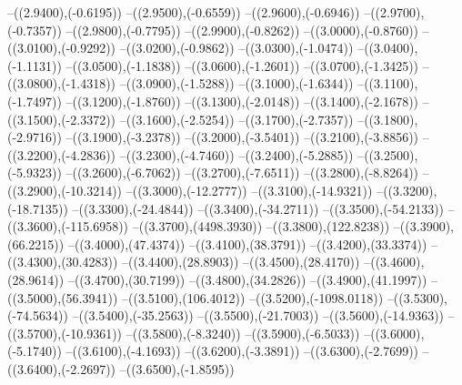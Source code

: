 {	--({\sx*(2.9400)},{\sy*(-0.6195)})
	--({\sx*(2.9500)},{\sy*(-0.6559)})
	--({\sx*(2.9600)},{\sy*(-0.6946)})
	--({\sx*(2.9700)},{\sy*(-0.7357)})
	--({\sx*(2.9800)},{\sy*(-0.7795)})
	--({\sx*(2.9900)},{\sy*(-0.8262)})
	--({\sx*(3.0000)},{\sy*(-0.8760)})
	--({\sx*(3.0100)},{\sy*(-0.9292)})
	--({\sx*(3.0200)},{\sy*(-0.9862)})
	--({\sx*(3.0300)},{\sy*(-1.0474)})
	--({\sx*(3.0400)},{\sy*(-1.1131)})
	--({\sx*(3.0500)},{\sy*(-1.1838)})
	--({\sx*(3.0600)},{\sy*(-1.2601)})
	--({\sx*(3.0700)},{\sy*(-1.3425)})
	--({\sx*(3.0800)},{\sy*(-1.4318)})
	--({\sx*(3.0900)},{\sy*(-1.5288)})
	--({\sx*(3.1000)},{\sy*(-1.6344)})
	--({\sx*(3.1100)},{\sy*(-1.7497)})
	--({\sx*(3.1200)},{\sy*(-1.8760)})
	--({\sx*(3.1300)},{\sy*(-2.0148)})
	--({\sx*(3.1400)},{\sy*(-2.1678)})
	--({\sx*(3.1500)},{\sy*(-2.3372)})
	--({\sx*(3.1600)},{\sy*(-2.5254)})
	--({\sx*(3.1700)},{\sy*(-2.7357)})
	--({\sx*(3.1800)},{\sy*(-2.9716)})
	--({\sx*(3.1900)},{\sy*(-3.2378)})
	--({\sx*(3.2000)},{\sy*(-3.5401)})
	--({\sx*(3.2100)},{\sy*(-3.8856)})
	--({\sx*(3.2200)},{\sy*(-4.2836)})
	--({\sx*(3.2300)},{\sy*(-4.7460)})
	--({\sx*(3.2400)},{\sy*(-5.2885)})
	--({\sx*(3.2500)},{\sy*(-5.9323)})
	--({\sx*(3.2600)},{\sy*(-6.7062)})
	--({\sx*(3.2700)},{\sy*(-7.6511)})
	--({\sx*(3.2800)},{\sy*(-8.8264)})
	--({\sx*(3.2900)},{\sy*(-10.3214)})
	--({\sx*(3.3000)},{\sy*(-12.2777)})
	--({\sx*(3.3100)},{\sy*(-14.9321)})
	--({\sx*(3.3200)},{\sy*(-18.7135)})
	--({\sx*(3.3300)},{\sy*(-24.4844)})
	--({\sx*(3.3400)},{\sy*(-34.2711)})
	--({\sx*(3.3500)},{\sy*(-54.2133)})
	--({\sx*(3.3600)},{\sy*(-115.6958)})
	--({\sx*(3.3700)},{\sy*(4498.3930)})
	--({\sx*(3.3800)},{\sy*(122.8238)})
	--({\sx*(3.3900)},{\sy*(66.2215)})
	--({\sx*(3.4000)},{\sy*(47.4374)})
	--({\sx*(3.4100)},{\sy*(38.3791)})
	--({\sx*(3.4200)},{\sy*(33.3374)})
	--({\sx*(3.4300)},{\sy*(30.4283)})
	--({\sx*(3.4400)},{\sy*(28.8903)})
	--({\sx*(3.4500)},{\sy*(28.4170)})
	--({\sx*(3.4600)},{\sy*(28.9614)})
	--({\sx*(3.4700)},{\sy*(30.7199)})
	--({\sx*(3.4800)},{\sy*(34.2826)})
	--({\sx*(3.4900)},{\sy*(41.1997)})
	--({\sx*(3.5000)},{\sy*(56.3941)})
	--({\sx*(3.5100)},{\sy*(106.4012)})
	--({\sx*(3.5200)},{\sy*(-1098.0118)})
	--({\sx*(3.5300)},{\sy*(-74.5634)})
	--({\sx*(3.5400)},{\sy*(-35.2563)})
	--({\sx*(3.5500)},{\sy*(-21.7003)})
	--({\sx*(3.5600)},{\sy*(-14.9363)})
	--({\sx*(3.5700)},{\sy*(-10.9361)})
	--({\sx*(3.5800)},{\sy*(-8.3240)})
	--({\sx*(3.5900)},{\sy*(-6.5033)})
	--({\sx*(3.6000)},{\sy*(-5.1740)})
	--({\sx*(3.6100)},{\sy*(-4.1693)})
	--({\sx*(3.6200)},{\sy*(-3.3891)})
	--({\sx*(3.6300)},{\sy*(-2.7699)})
	--({\sx*(3.6400)},{\sy*(-2.2697)})
	--({\sx*(3.6500)},{\sy*(-1.8595)})
}

